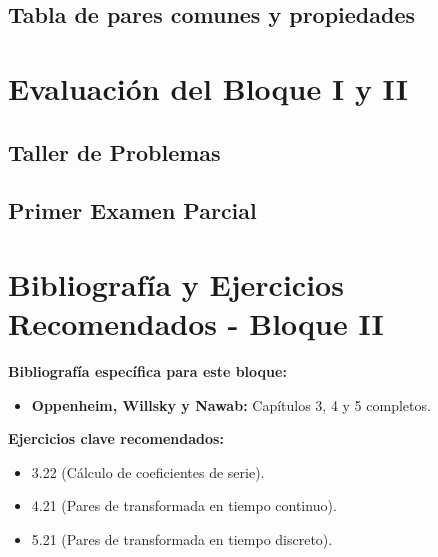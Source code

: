 \documentclass[11pt,a4paper,openany]{book}
\begin{document}
\section{Tabla de pares comunes y propiedades}



\chapter{Evaluación del Bloque I y II}

\section{Taller de Problemas}

\section{Primer Examen Parcial}


\cleardoublepage
{}
{}
\chapter*{Bibliografía y Ejercicios Recomendados - Bloque II}

\textbf{Bibliografía específica para este bloque:}
\begin{itemize}
	\item \textbf{Oppenheim, Willsky y Nawab:} Capítulos 3, 4 y 5 completos.
\end{itemize}

\textbf{Ejercicios clave recomendados:}
\begin{itemize}
	\item 3.22 (Cálculo de coeficientes de serie).
	\item 4.21 (Pares de transformada en tiempo continuo).
	\item 5.21 (Pares de transformada en tiempo discreto).
\end{itemize}
\end{document}
